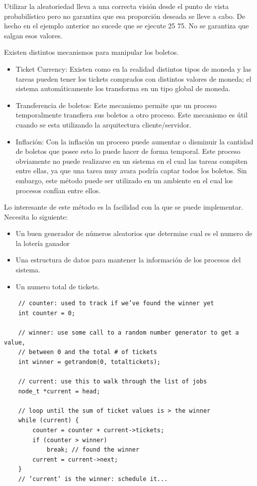 \documentclass[titlepage,a4paper]{article}
\begin{document}
Utilizar la aleatoriedad lleva a una correcta visión desde el punto de vista probabilístico pero no garantiza que esa proporción deseada se lleve a cabo. De hecho en el ejemplo anterior no sucede que se ejecute 25 75. No se garantiza que salgan esos valores.

Existen distintos mecanismos para manipular los boletos.
\begin{itemize}
    \item Ticket Currency: Existen como en la realidad distintos tipos de moneda y las tareas pueden tener los tickets comprados con distintos valores de moneda; el sistema automáticamente los transforma en un tipo global de moneda.
    \item Transferencia de boletos: Este mecanismo permite que un proceso temporalmente transfiera sus boletos a otro proceso. Este mecanismo es útil cuando se esta utilizando la arquitectura cliente/servidor.
    \item Inflación: Con la inflación un proceso puede aumentar o disminuir la cantidad de boletos que posee esto lo puede hacer de forma temporal. Este proceso obviamente no puede realizarse en un sistema en el cual las tareas compiten entre ellas, ya que una tarea muy avara podría captar todos los boletos. Sin embargo, este método puede ser utilizado en un ambiente en el cual los procesos confían entre ellos.
\end{itemize}

Lo interesante de este método es la facilidad con la que se puede implementar. Necesita lo siguiente:
\begin{itemize}
    \item Un buen generador de números aleatorios que determine cual es el numero de la lotería ganador
    \item Una estructura de datos para mantener la información de los procesos del sistema.
    \item Un numero total de tickets.
\end{itemize}

\begin{verbatim}
    // counter: used to track if we’ve found the winner yet
    int counter = 0;
    
    // winner: use some call to a random number generator to get a value,
    // between 0 and the total # of tickets
    int winner = getrandom(0, totaltickets);
    
    // current: use this to walk through the list of jobs
    node_t *current = head;
    
    // loop until the sum of ticket values is > the winner
    while (current) {
        counter = counter + current->tickets;
        if (counter > winner)
            break; // found the winner
        current = current->next;
    }
    // ’current’ is the winner: schedule it...
\end{verbatim}
\end{document}
